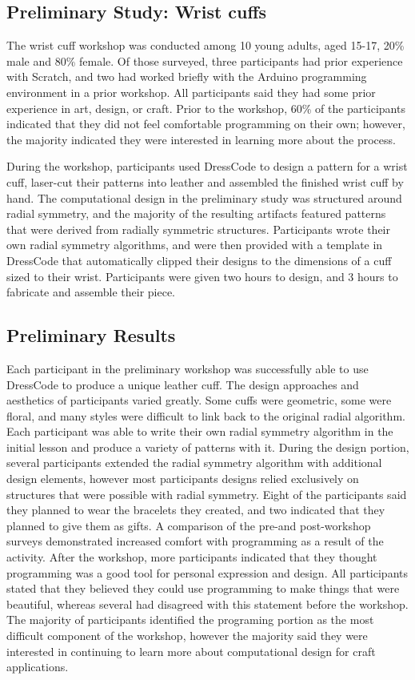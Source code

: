 \documentclass{sigchi}
\begin{document}
\subsection{Preliminary Study: Wrist cuffs}
The wrist cuff workshop was conducted among 10 young adults, aged 15-17, 20\% male and 80\% female. Of those surveyed, three participants had prior experience with Scratch, and two had worked briefly with the Arduino programming environment in a prior workshop. All participants said they had some prior experience in art, design, or craft. Prior to the workshop, 60\% of the participants indicated that they did not feel comfortable programming on their own; however, the majority indicated they were interested in learning more about the process. 

During the workshop, participants used DressCode to design a pattern for a wrist cuff, laser-cut their patterns into leather and assembled the finished wrist cuff by hand. The computational design in the preliminary study was structured around radial symmetry, and the majority of the resulting artifacts featured patterns that were derived from radially symmetric structures. Participants wrote their own radial symmetry algorithms, and were then provided with a template in DressCode that automatically clipped their designs to the dimensions of a cuff sized to their wrist. Participants were given two hours to design, and 3 hours to fabricate and assemble their piece.

\subsection{Preliminary Results}
Each participant in the preliminary workshop was successfully able to use DressCode to produce a unique leather cuff. The design approaches and aesthetics of participants varied greatly. Some cuffs were geometric, some were floral, and many styles were difficult to link back to the original radial algorithm. Each participant was able to write their own radial symmetry algorithm in the initial lesson and produce a variety of patterns with it. During the design portion, several participants extended the radial symmetry algorithm with additional design elements, however most participants designs relied exclusively on structures that were possible with radial symmetry. Eight of the participants said they planned to wear the bracelets they created, and two indicated that they planned to give them as gifts. A comparison of the
pre-and post-workshop surveys demonstrated increased comfort with programming as a result of the activity. After the workshop, more participants indicated that they thought programming was a good tool for personal expression and design. All participants stated that they believed they could use programming to make things that were beautiful, whereas several had disagreed with this statement before the workshop. The majority of participants identified the programing portion as the most difficult component of the workshop, however the majority said they were interested in continuing to learn more about computational design for craft applications. 
\end{document}
